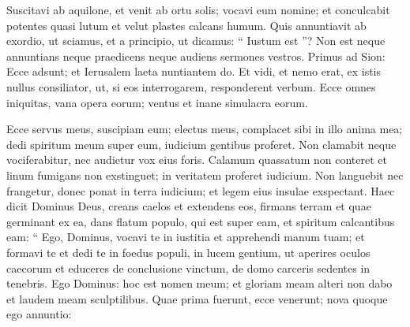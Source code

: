 \begin{biblechapter}
\begin{biblechapter}
\begin{biblechapter}
\begin{biblechapter}
\begin{biblechapter}
\begin{biblechapter}
\begin{biblechapter}
\begin{biblechapter}
\begin{biblechapter}
\begin{biblechapter}
\begin{biblechapter}
\begin{biblechapter}
\begin{biblechapter}
\begin{biblechapter}
\begin{biblechapter}
\begin{biblechapter}
\begin{biblechapter}
\begin{biblechapter}
\begin{biblechapter}
\begin{biblechapter}
\begin{biblechapter}
\begin{biblechapter}
\begin{biblechapter}
\begin{biblechapter}
\begin{biblechapter}
\begin{biblechapter}
\begin{biblechapter}
\begin{biblechapter}
\begin{biblechapter}
\begin{biblechapter}
\begin{biblechapter}
\begin{biblechapter}
\begin{biblechapter}
\begin{biblechapter}
\begin{biblechapter}
\begin{biblechapter}
\begin{biblechapter}
\begin{biblechapter}
\begin{biblechapter}
\begin{biblechapter}
\begin{biblechapter}
 \verse Suscitavi ab aquilone,
 et venit ab ortu solis;
 vocavi eum nomine;
 et conculcabit potentes quasi lutum
 et velut plastes calcans humum.
 \verse Quis annuntiavit ab exordio, ut sciamus,
 et a principio, ut dicamus: “ Iustum est ”?
 Non est neque annuntians neque praedicens
 neque audiens sermones vestros.
 \verse Primus ad Sion: Ecce adsunt;
 et Ierusalem laeta nuntiantem do.
 \verse Et vidi, et nemo erat,
 ex istis nullus consiliator,
 ut, si eos interrogarem,
 responderent verbum.
 \verse Ecce omnes iniquitas,
 vana opera eorum;
 ventus et inane
 simulacra eorum.
 
\begin{biblechapter}
\verse Ecce servus meus, suscipiam eum;
 electus meus, complacet sibi in illo anima mea;
 dedi spiritum meum super eum,
 iudicium gentibus proferet.
 \verse Non clamabit neque vociferabitur,
 nec audietur vox eius foris.
 \verse Calamum quassatum non conteret
 et linum fumigans non exstinguet;
 in veritatem proferet iudicium.
 \verse Non languebit nec frangetur,
 donec ponat in terra iudicium;
 et legem eius insulae exspectant.
 \verse Haec dicit Dominus Deus,
 creans caelos et extendens eos,
 firmans terram et quae germinant ex ea,
 dans flatum populo, qui est super eam,
 et spiritum calcantibus eam:
 \verse “ Ego, Dominus, vocavi te in iustitia
 et apprehendi manum tuam;
 et formavi te et dedi te
 in foedus populi, in lucem gentium,
 \verse ut aperires oculos caecorum
 et educeres de conclusione vinctum,
 de domo carceris sedentes in tenebris.
 \verse Ego Dominus: hoc est nomen meum;
 et gloriam meam alteri non dabo
 et laudem meam sculptilibus.
 \verse Quae prima fuerunt, ecce venerunt;
 nova quoque ego annuntio:

\end{biblechapter}
\end{biblechapter}
\end{biblechapter}
\end{biblechapter}
\end{biblechapter}
\end{biblechapter}
\end{biblechapter}
\end{biblechapter}
\end{biblechapter}
\end{biblechapter}
\end{biblechapter}
\end{biblechapter}
\end{biblechapter}
\end{biblechapter}
\end{biblechapter}
\end{biblechapter}
\end{biblechapter}
\end{biblechapter}
\end{biblechapter}
\end{biblechapter}
\end{biblechapter}
\end{biblechapter}
\end{biblechapter}
\end{biblechapter}
\end{biblechapter}
\end{biblechapter}
\end{biblechapter}
\end{biblechapter}
\end{biblechapter}
\end{biblechapter}
\end{biblechapter}
\end{biblechapter}
\end{biblechapter}
\end{biblechapter}
\end{biblechapter}
\end{biblechapter}
\end{biblechapter}
\end{biblechapter}
\end{biblechapter}
\end{biblechapter}
\end{biblechapter}
\end{biblechapter}
